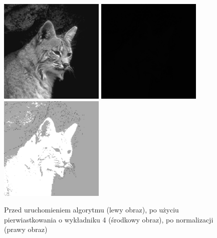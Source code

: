 \documentclass[a4paper,12pt]{book}
\begin{document}
\begin{figure}[H]
	\caption{Przed uruchomieniem algorytmu (lewy obraz), po użyciu pierwiastkowania o wykładniku 4 (środkowy obraz), po normalizacji (prawy obraz)}
	\includegraphics[width=5cm, height=5cm]{cat-unmodified.jpg}
	\includegraphics[width=5cm, height=5cm]{2-6/root-gray-cat-4.png}
	\includegraphics[width=5cm, height=5cm]{2-6/root-gray-cat-4-norm.png}
\end{figure}
\end{document}
